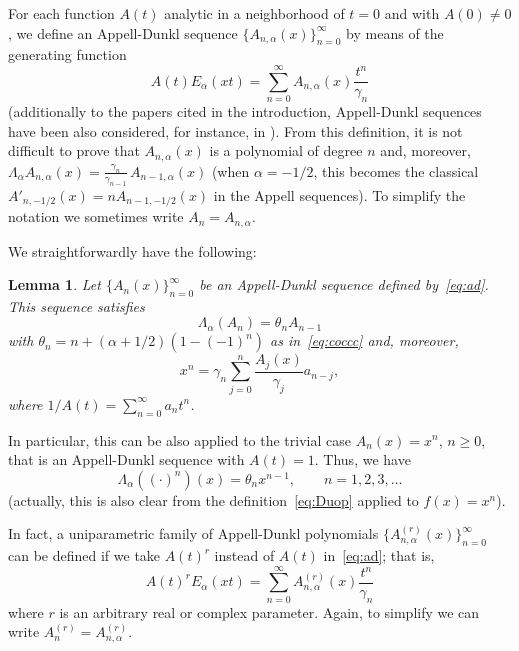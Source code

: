 \documentclass[10pt]{article}
\theoremstyle{plain}
\newtheorem{lemma}[theorem]{Lemma}
\theoremstyle{definition}
\numberwithin{equation}{section} %
\newcommand{\Ea}{E_{\alpha}}
\newcommand{\La}{\Lambda_{\alpha}}
\newcommand{\cc}{\gamma}
\begin{document}
For each function $A(t)$ analytic in a neighborhood of $t=0$ and with $A(0) \ne 0$, we define an Appell-Dunkl sequence $\{A_{n,\alpha}(x)\}_{n=0}^{\infty}$ by means of the generating function
\begin{equation}
\label{eq:ad}
  A(t)\Ea(xt) = \sum_{n=0}^\infty A_{n,\alpha}(x) \frac{t^n}{\cc_n}
\end{equation}
(additionally to the papers \cite{AlS, Ros} cited in the introduction, Appell-Dunkl sequences have been also considered, for instance, in \cite{BG, BKI, DH}).
From this definition, it is not difficult to prove that $A_{n,\alpha}(x)$ is a polynomial of degree $n$ and, moreover, $\La A_{n,\alpha}(x) = \frac{\cc_{n}}{\cc_{n-1}}\, A_{n-1,\alpha}(x)$ (when $\alpha=-1/2$, this becomes the classical $A'_{n,-1/2}(x) = nA_{n-1,-1/2}(x)$ in the Appell sequences). 
To simplify the notation we sometimes write $A_n=A_{n,\alpha}$.

We straightforwardly have the following:

\begin{lemma}
\label{lem:xn}
Let $\{A_n(x)\}_{n=0}^{\infty}$ be an Appell-Dunkl sequence defined by~\eqref{eq:ad}. This sequence satisfies 
\begin{equation}
\label{eq:LaAn}
  \La(A_n) = \theta_n A_{n-1}
\end{equation}
with $\theta_n = n+(\alpha+1/2)(1-(-1)^n)$ as in~\eqref{eq:coccc} and, moreover,
\begin{equation}
\label{eq:xn}
  x^n = \cc_n\sum_{j=0}^n \frac{A_j(x)}{\cc_j}a_{n-j},
\end{equation}
where ${1}/{A(t)} = \sum_{n=0}^\infty a_nt^n$. 
\end{lemma}

In particular, this can be also applied to the trivial case $A_n(x)=x^n$, $n\ge 0$,
that is an Appell-Dunkl sequence with $A(t) = 1$. Thus, we have
\begin{equation*}
  \La((\cdot)^n)(x) = \theta_n x^{n-1}, \qquad n = 1, 2, 3,\dots
\end{equation*}
(actually, this is also clear from the definition~\eqref{eq:Duop} applied to $f(x) = x^n$).

In fact, a uniparametric family of Appell-Dunkl polynomials $\{A_{n,\alpha}^{(r)}(x)\}_{n=0}^{\infty}$ can be defined if we take $A(t)^r$ instead of $A(t)$ in~\eqref{eq:ad}; that is,
\begin{equation}
\label{eq:adr}
A(t)^r \Ea(xt) = \sum_{n=0}^{\infty} A_{n,\alpha}^{(r)}(x) \frac{t^n}{\cc_n}
\end{equation}
where $r$ is an arbitrary real or complex parameter.
Again, to simplify we can write $A_{n}^{(r)}=A_{n,\alpha}^{(r)}$.
\end{document}
